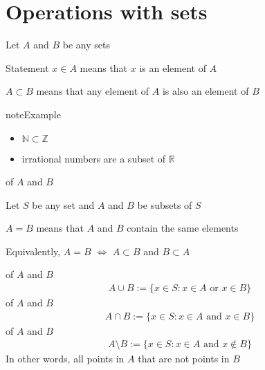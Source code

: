 \documentclass[letterpaper,10pt,english]{jupyterBook}
\begin{document}
\section{Operations with sets}
\label{\detokenize{03.set_theory:operations-with-sets}}
\sphinxAtStartPar
Let \(A\) and \(B\) be any sets

\sphinxAtStartPar
Statement \(x \in A\) means that \(x\) is an element of \(A\)

\sphinxAtStartPar
\(A \subset B\) means that any element of \(A\) is also an element of \(B\)

\begin{sphinxadmonition}{note}{Example}
\begin{itemize}
\item {} 
\sphinxAtStartPar
\(\mathbb{N} \subset \mathbb{Z}\)

\item {} 
\sphinxAtStartPar
irrational numbers are a subset of \(\mathbb{R}\)

\end{itemize}
\end{sphinxadmonition}

\sphinxAtStartPar
{} of \(A\) and \(B\)

\sphinxAtStartPar
Let \(S\) be any set and \(A\) and \(B\) be subsets of \(S\)

\sphinxAtStartPar
\(A = B\) means that \(A\) and \(B\) contain the same elements

\sphinxAtStartPar
Equivalently, \(A = B\) \(\iff\) \(A \subset B\) and \(B \subset A\)

\sphinxAtStartPar
{} of \(A\) and \(B\)
\begin{equation*}
\begin{split}
A \cup B := 
\{ x \in S : x \in A \text{ or } x \in B \}
\end{split}
\end{equation*}
\sphinxAtStartPar
{} of \(A\) and \(B\)
\begin{equation*}
\begin{split}
A \cap B := 
\{ x \in S : x \in A \text{ and } x \in B \}
\end{split}
\end{equation*}
\sphinxAtStartPar
{} of \(A\) and \(B\)
\begin{equation*}
\begin{split}
A \setminus B := 
\{ x \in S : x \in A \text{ and } x \notin B \}
\end{split}
\end{equation*}
\sphinxAtStartPar
In other words, all points in \(A\) that are not points in \(B\)
\end{document}
